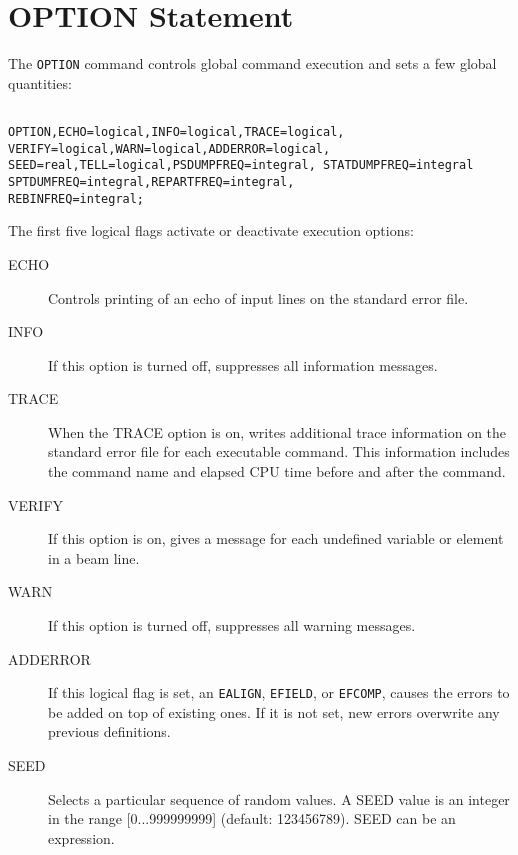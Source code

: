 \section{OPTION Statement}
\label{sec:option}
The \texttt{OPTION} command controls global command execution and sets
a few global quantities:
\begin{verbatim}

OPTION,ECHO=logical,INFO=logical,TRACE=logical,
VERIFY=logical,WARN=logical,ADDERROR=logical,
SEED=real,TELL=logical,PSDUMPFREQ=integral, STATDUMPFREQ=integral
SPTDUMFREQ=integral,REPARTFREQ=integral,
REBINFREQ=integral;
\end{verbatim}
The first five logical flags activate or deactivate execution options:
\begin{description}
\item[ECHO]
  Controls printing of an echo of input lines on the standard error file.
\item[INFO]
  If this option is turned off, \opal suppresses all information messages. 
\item[TRACE]
  When the TRACE option is on,
  \opal writes additional trace information on the standard error file 
  for each executable command. 
  This information includes the command name
  and elapsed CPU time before and after the command.
\item[VERIFY]
  If this option is on, \opal gives a message for each undefined variable
  or element in a beam line.
\item[WARN]
  If this option is turned off, \opal suppresses all warning messages.
\item[ADDERROR]
  If this logical flag is set,
  an \texttt{EALIGN}, \texttt{EFIELD}, or \texttt{EFCOMP}, causes the errors to
  be added on top of existing ones.
  If it is not set, new errors overwrite any previous definitions.
\item[SEED]
  Selects a particular sequence of random values.
  A SEED value is an integer in the range [0...999999999] (default: 123456789).
  SEED can be an expression.

\end{description}
